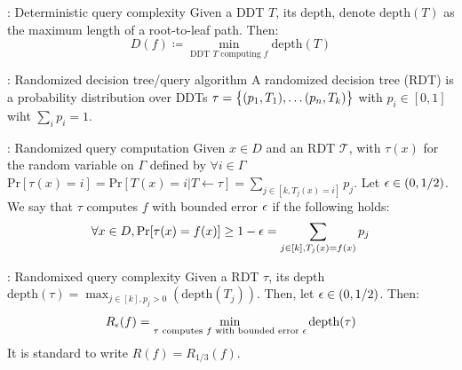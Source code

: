 \begin{defbox}{: Deterministic query complexity}{}
    Given a DDT $T$, its depth, denote $\text{depth}(T)$ as the maximum length of a root-to-leaf path. Then:
    \begin{equation}
        D(f) \coloneqq \min_{\text{DDT $T$ computing $f$}}\text{depth}(T)
    \end{equation}
    
\end{defbox}

\begin{defbox}{: Randomized decision tree/query algorithm}{}
    A randomized decision tree (RDT) is a probability distribution over DDTs $\tau = \set{(p_1, T_1), \ldots (p_n, T_k)}$ with $p_i \in [0, 1]$ wiht $\sum_i p_i = 1$. 
\end{defbox}

\begin{defbox}{: Randomized query computation}
    Given $x \in D$ and an RDT $\mathcal{T}$, with $\tau(x)$ for the random variable on $\Gamma$ defined by $\forall i \in \Gamma$ $\text{Pr}[\tau(x) = i] = \text{Pr}[T(x) = i \vert T \leftarrow \tau] = \sum_{j \in [k, T_j(x) = i]}p_j$. Let $\epsilon \in (0, 1/2)$. We say that $\tau$ computes $f$ with bounded error $\epsilon$ if the following holds:
    \begin{equation}
        \forall x \in D, \text{Pr}[\tau(x) = f(x)] \geq 1 - \epsilon = \sum_{j \in [k], T_j(x) = f(x)}p_j
    \end{equation}
\end{defbox}

\begin{defbox}{: Randomixed query complexity}
    Given a RDT $\tau$, its depth $\text{depth}(\tau) = \max_{j \in [k], p_j > 0} (\text{depth}(T_j))$. Then, let $\epsilon \in (0, 1/2)$. Then:
    \begin{equation}
        R_{\epsilon}(f) = \min_{\text{$\tau$ computes $f$ with bounded error $\epsilon$}} \text{depth}(\tau)
    \end{equation}
    It is standard to write $R(f) = R_{1/3}(f)$. 
\end{defbox}